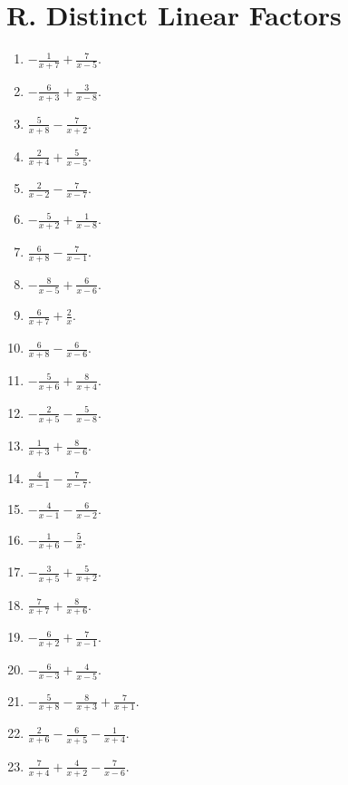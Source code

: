 \documentclass[11pt,oneside]{book}
\begin{document}
\section*{R. Distinct Linear Factors}
\begin{enumerate}[leftmargin=*,label=\textbf{R\arabic*.},itemsep=0.45\baselineskip]
\item $\displaystyle - \frac{1}{x + 7} + \frac{7}{x - 5}$.
\item $\displaystyle - \frac{6}{x + 3} + \frac{3}{x - 8}$.
\item $\displaystyle \frac{5}{x + 8} - \frac{7}{x + 2}$.
\item $\displaystyle \frac{2}{x + 4} + \frac{5}{x - 5}$.
\item $\displaystyle \frac{2}{x - 2} - \frac{7}{x - 7}$.
\item $\displaystyle - \frac{5}{x + 2} + \frac{1}{x - 8}$.
\item $\displaystyle \frac{6}{x + 8} - \frac{7}{x - 1}$.
\item $\displaystyle - \frac{8}{x - 5} + \frac{6}{x - 6}$.
\item $\displaystyle \frac{6}{x + 7} + \frac{2}{x}$.
\item $\displaystyle \frac{6}{x + 8} - \frac{6}{x - 6}$.
\item $\displaystyle - \frac{5}{x + 6} + \frac{8}{x + 4}$.
\item $\displaystyle - \frac{2}{x + 5} - \frac{5}{x - 8}$.
\item $\displaystyle \frac{1}{x + 3} + \frac{8}{x - 6}$.
\item $\displaystyle \frac{4}{x - 1} - \frac{7}{x - 7}$.
\item $\displaystyle - \frac{4}{x - 1} - \frac{6}{x - 2}$.
\item $\displaystyle - \frac{1}{x + 6} - \frac{5}{x}$.
\item $\displaystyle - \frac{3}{x + 5} + \frac{5}{x + 2}$.
\item $\displaystyle \frac{7}{x + 7} + \frac{8}{x + 6}$.
\item $\displaystyle - \frac{6}{x + 2} + \frac{7}{x - 1}$.
\item $\displaystyle - \frac{6}{x - 3} + \frac{4}{x - 5}$.
\item $\displaystyle - \frac{5}{x + 8} - \frac{8}{x + 3} + \frac{7}{x + 1}$.
\item $\displaystyle \frac{2}{x + 6} - \frac{6}{x + 5} - \frac{1}{x + 4}$.
\item $\displaystyle \frac{7}{x + 4} + \frac{4}{x + 2} - \frac{7}{x - 6}$.

\end{enumerate}
\end{document}
